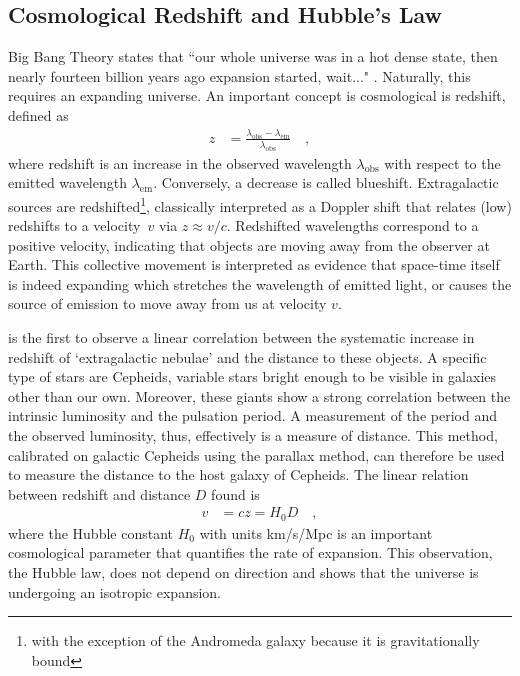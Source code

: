 \documentclass[MScProj_TLRH_ClusterEnergy.tex]{subfiles}
\begin{document}
\subsection*{Cosmological Redshift and Hubble's Law}
\label{sec:redshift}

Big Bang Theory states that ``our whole universe was in a hot dense state, then 
nearly fourteen billion years ago expansion started, wait..." \citep{BigBangTheory}.
Naturally, this requires an expanding universe. An important concept is 
cosmological is redshift, defined as
\begin{align}
    z &= \frac{\lambda_{\text{obs}} - \lambda_{\text{em}}}{\lambda_{\text{obs}}} \quad ,
\end{align}
\noindent where redshift is an increase in the observed wavelength 
$\lambda_{\text{obs}}$ with respect to the emitted wavelength $\lambda_{\text{em}}$.
Conversely, a decrease is called blueshift. Extragalactic sources are redshifted\footnote{
with the exception of the Andromeda galaxy because it is gravitationally bound}, 
classically interpreted as a Doppler shift that relates (low) redshifts to a 
velocity~$v$ via $z\approx v/c$. Redshifted wavelengths correspond to a positive
velocity, indicating that objects are moving away from the observer at Earth.
This collective movement is interpreted as evidence that space-time itself is 
indeed expanding which stretches the wavelength of emitted light, or causes 
the source of emission to move away from us at velocity $v$.

\citet{1929PNAS...15..168H} is the first to observe a linear correlation between
the systematic increase in redshift of `extragalactic nebulae' and the distance 
to these objects. A specific type of stars are Cepheids, variable stars bright
enough to be visible in galaxies other than our own. Moreover, these giants show
a strong correlation between the intrinsic luminosity and the pulsation period. 
A measurement of the period and the observed luminosity, thus, effectively is a 
measure of distance. This method, calibrated on galactic Cepheids using the 
parallax method, can therefore be used to measure the distance to the host galaxy 
of Cepheids. The linear relation between redshift and distance $D$ found is
\begin{align}
    v &= cz = H_0 D \quad ,
\end{align}
\noindent where the Hubble constant $H_0$ with units km/s/Mpc is an important 
cosmological parameter that quantifies the rate of expansion. This observation, 
the Hubble law, does not depend on direction and shows that the universe is
undergoing an isotropic expansion. 
\end{document}
